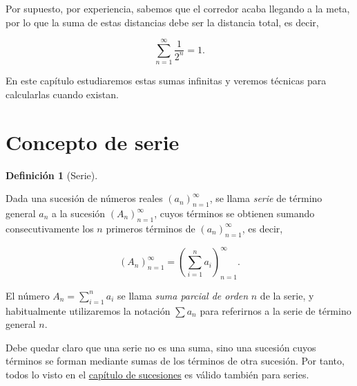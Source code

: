 \documentclass[
  a4paper,
]{scrreport}
\theoremstyle{definition}
\theoremstyle{plain}
\theoremstyle{definition}
\newtheorem{definition}{Definición}[chapter]
\theoremstyle{definition}
\theoremstyle{plain}
\theoremstyle{plain}
\theoremstyle{remark}
\begin{document}
Por supuesto, por experiencia, sabemos que el corredor acaba llegando a
la meta, por lo que la suma de estas distancias debe ser la distancia
total, es decir,

\[
\sum_{n=1}^\infty \frac{1}{2^n} = 1.
\]

En este capítulo estudiaremos estas sumas infinitas y veremos técnicas
para calcularlas cuando existan.

\section{Concepto de serie}\label{concepto-de-serie}

\begin{definition}[Serie]\protect\hypertarget{def-serie}{}\label{def-serie}

Dada una sucesión de números reales \((a_n)_{n=1}^\infty\), se llama
\emph{serie} de término general \(a_n\) a la sucesión
\((A_n)_{n=1}^\infty\), cuyos términos se obtienen sumando
consecutivamente los \(n\) primeros términos de \((a_n)_{n=1}^\infty\),
es decir,

\[
(A_n)_{n=1}^\infty= \left(\sum_{i=1}^na_i\right)_{n=1}^\infty.
\]

El número \(A_n=\sum_{i=1}^n a_i\) se llama \emph{suma parcial de orden}
\(n\) de la serie, y habitualmente utilizaremos la notación \(\sum a_n\)
para referirnos a la serie de término general \(n\).

\end{definition}

\begin{tcolorbox}[enhanced jigsaw, leftrule=.75mm, colbacktitle=quarto-callout-important-color!10!white, toprule=.15mm, opacityback=0, opacitybacktitle=0.6, toptitle=1mm, breakable, bottomtitle=1mm, colframe=quarto-callout-important-color-frame, rightrule=.15mm, titlerule=0mm, title=\textcolor{quarto-callout-important-color}{\faExclamation}\hspace{0.5em}{Importante}, arc=.35mm, left=2mm, bottomrule=.15mm, colback=white, coltitle=black]

Debe quedar claro que una serie no es una suma, sino una sucesión cuyos
términos se forman mediante sumas de los términos de otra sucesión. Por
tanto, todos lo visto en el
\href{https://aprendeconalf.es/analisis-manual/sucesiones.html}{capítulo
de sucesiones} es válido también para series.

\end{tcolorbox}
\end{document}

